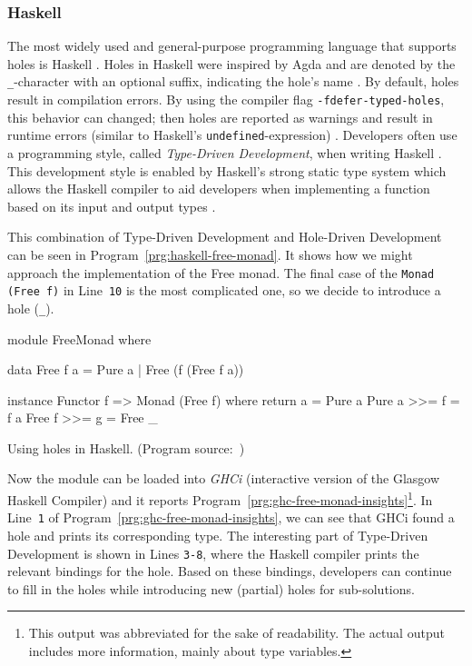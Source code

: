 \subsubsection{Haskell}
\label{sec:holes-languages-haskell}
The most widely used and general-purpose programming language that supports holes is Haskell \cite{tiobe_software_bv_tiobe_2023, stack_overflow_stack_2023}.
Holes in Haskell were inspired by Agda and are denoted by the \verb|_|-character with an optional suffix, indicating the hole's name \cite{gamari_haskell_2019}.
By default, holes result in compilation errors.
By using the compiler flag \verb|-fdefer-typed-holes|, this behavior can changed; then holes are reported as warnings and result in runtime errors (similar to Haskell's \verb|undefined|-expression) \cite{ghc_team_deferring_2023}.
Developers often use a programming style, called \emph{Type-Driven Development}, when writing Haskell \cite{gissurarson_suggesting_2018}.
This development style is enabled by Haskell's strong static type system which allows the Haskell compiler to aid developers when implementing a function based on its input and output types \cite{gissurarson_suggesting_2018}.


This combination of Type-Driven Development and Hole-Driven Development can be seen in Program~\ref{prg:haskell-free-monad}.
It shows how we might approach the implementation of the Free monad.
The final case of the \texttt{Monad (Free f)} in Line~\verb|10| is the most complicated one, so we decide to introduce a hole (\verb|_|).

\begin{program}[ht]
\begin{GenericCode}
module FreeMonad where

data Free f a
  = Pure a
  | Free (f (Free f a))

instance Functor f => Monad (Free f) where
  return a     = Pure a
  Pure a >>= f = f a
  Free f >>= g = Free _
\end{GenericCode}
\caption{Using holes in Haskell. (Program source:~\cite{gamari_haskell_2019})}
\label{prg:haskell-free-monad}
\end{program}

Now the module can be loaded into \emph{GHCi} (interactive version of the Glasgow Haskell Compiler) and it reports Program~\ref{prg:ghc-free-monad-insights}\footnote{This output was abbreviated for the sake of readability. The actual output includes more information, mainly about type variables.}.
In Line~\verb|1| of Program~\ref{prg:ghc-free-monad-insights}, we can see that GHCi found a hole and prints its corresponding type.
The interesting part of Type-Driven Development is shown in Lines \verb|3-8|, where the Haskell compiler prints the relevant bindings for the hole.
Based on these bindings, developers can continue to fill in the holes while introducing new (partial) holes for sub-solutions.

